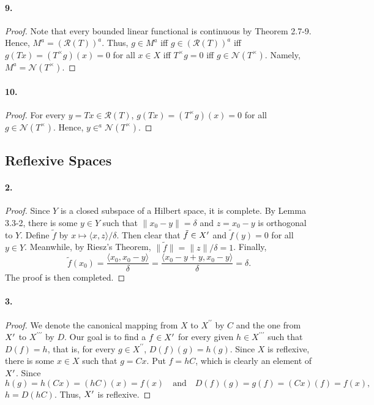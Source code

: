   \paragraph{9.}
  \begin{proof}
    Note that every bounded linear functional is continuous by Theorem 2.7-9. 
    Hence, $M^a=(\mathcal{R}(T))^a$. Thus, $g\in M^a$ iff $g\in(\mathcal{R}
    (T))^a$ iff $g(Tx)=(T^\times g)(x)=0$ for all $x\in X$ iff $T^\times g=0$
    iff $g\in\mathcal{N}(T^\times)$. Namely, $M^a=\mathcal{N}(T^\times)$.
  \end{proof}
  
  \paragraph{10.}
  \begin{proof}
    For every $y=Tx\in\mathcal{R}(T)$, $g(Tx)=(T^\times g)(x)=0$ for all $g\in
    \mathcal{N}(T^\times)$. Hence, $y\in ^a\mathcal{N}(T^\times)$.
  \end{proof}
\subsection{Reflexive Spaces}
  \paragraph{2.}
  \begin{proof}
    Since $Y$ is a closed subspace of a Hilbert space, it is complete. By Lemma
    3.3-2, there is some $y\in Y$ such that $\|x_0-y\|=\delta$ and $z=x_0-y$ is
    orthogonal to $Y$. Define $\tilde{f}$ by $x\mapsto\langle x,z\rangle/
    \delta$. Then clear that $\tilde{f}\in X^\prime$ and $\tilde{f}(y)=0$ for all $y
    \in Y$. Meanwhile, by Riesz's Theorem, $\|\tilde{f}\|=\|z\|/\delta=1$. 
    Finally,
    \[
      \tilde{f}(x_0)=\frac{\langle x_0,x_0-y\rangle}{\delta}=
      \frac{\langle x_0-y+y,x_0-y\rangle}{\delta}=\delta.
    \]
    The proof is then completed.
  \end{proof}
  
  \paragraph{3.}
  \begin{proof}
    We denote the canonical mapping from $X$ to $X^{\prime\prime}$ by $C$ and 
    the one from $X^\prime$ to $X^{\prime\prime\prime}$ by $D$. Our goal is to find
    a $f\in X^\prime$ for every given $h\in X^{\prime\prime\prime}$ such that $D(f)=
    h$, that is, for every $g\in X^{\prime\prime}$, $D(f)(g)=h(g)$. Since $X$ is
    reflexive, there is some $x\in X$ such that $g=Cx$. Put $f=hC$, which is 
    clearly an element of $X^\prime$. Since
    \[
      h(g) = h(Cx)=(hC)(x)=f(x)\quad\text{and}\quad
      D(f)(g)=g(f)=(Cx)(f)=f(x),
    \]
    $h=D(hC)$. Thus, $X^\prime$ is reflexive.
  \end{proof}
  
